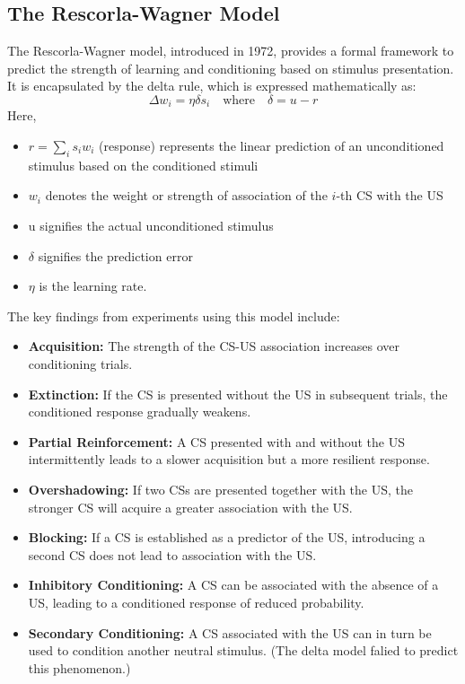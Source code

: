 \documentclass[11pt]{book} %
\begin{document}
%
%
%

\subsection{The Rescorla-Wagner Model}
The Rescorla-Wagner model, introduced in 1972, provides a formal framework to predict the strength of learning and conditioning based on stimulus presentation. It is encapsulated by the delta rule, which is expressed mathematically as:
\begin{equation}
    \Delta w_i = \eta \delta s_i \quad \text{where} \quad \delta = u - r
\end{equation}
Here, 
\begin{itemize}
    \item \( r = \sum_i s_i w_i \) (response) represents the linear prediction of an unconditioned stimulus based on the conditioned stimuli
    \item \( w_i \) denotes the weight or strength of association of the \( i \)-th CS with the US
    \item u signifies the actual unconditioned stimulus 
    \item \( \delta \) signifies the prediction error 
    \item \( \eta \) is the learning rate. 
\end{itemize}

The key findings from experiments using this model include:
\begin{itemize}
    \item \textbf{Acquisition:} The strength of the CS-US association increases over conditioning trials.
    \item \textbf{Extinction:} If the CS is presented without the US in subsequent trials, the conditioned response gradually weakens.
    \item \textbf{Partial Reinforcement:} A CS presented with and without the US intermittently leads to a slower acquisition but a more resilient response.
    \item \textbf{Overshadowing:} If two CSs are presented together with the US, the stronger CS will acquire a greater association with the US.
    \item \textbf{Blocking:} If a CS is established as a predictor of the US, introducing a second CS does not lead to association with the US.
    \item \textbf{Inhibitory Conditioning:} A CS can be associated with the absence of a US, leading to a conditioned response of reduced probability.
    \item \textbf{Secondary Conditioning:} A CS associated with the US can in turn be used to condition another neutral stimulus. (The delta model falied to predict this phenomenon.)
\end{itemize}
\end{document}
